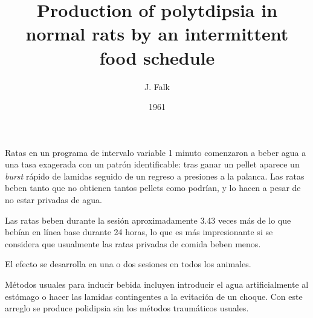 \documentclass[a4paper,12pt]{article}
\title{Production of polytdipsia in normal rats by an intermittent food schedule}
\author{J. Falk}
\date{1961}
\begin{document}
{\scshape\bfseries \maketitle}

Ratas en un programa de intervalo variable 1 minuto comenzaron a beber agua a una tasa exagerada con un patrón identificable: tras ganar un pellet aparece un {\itshape burst} rápido de lamidas seguido de un regreso a presiones a la palanca. Las ratas beben tanto que no obtienen tantos pellets como podrían, y lo hacen a pesar de no estar privadas de agua.

Las ratas beben durante la sesión aproximadamente 3.43 veces más de lo que bebían en línea base durante 24 horas, lo que es más impresionante si se considera que usualmente las ratas privadas de comida beben menos.

El efecto se desarrolla en una o dos sesiones en todos los animales.

Métodos usuales para inducir bebida incluyen introducir el agua artificialmente al estómago o hacer las lamidas contingentes a la evitación de un choque. Con este arreglo se produce polidipsia sin los métodos traumáticos usuales.
\end{document}
